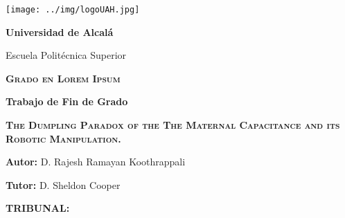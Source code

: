 
\enlargethispage{1cm}
\thispagestyle{empty}

\begin{center}
\texttt{[image: ../img/logoUAH.jpg]}
\par\end{center}

\begin{center}
\textbf{\huge Universidad de Alcalá}
\par\end{center}{\huge \par}

\begin{center}
{\Large Escuela Politécnica Superior}
\par\end{center}{\Large \par}

\medskip{}


\begin{center}
\textbf{\textsc{\huge Grado en Lorem Ipsum }}
\par\end{center}{\huge \par}

\medskip{}


\begin{center}
\textbf{\Large Trabajo de Fin de Grado}
\par\end{center}{\Large \par}

\begin{center}
\textbf{\textsc{\LARGE 
The Dumpling Paradox of the The Maternal Capacitance and its Robotic Manipulation.
}}
\par\end{center}{\LARGE \par}

\medskip{}


\begin{center}
\textbf{\large Autor:}{\large{} D. Rajesh Ramayan Koothrappali}
\par\end{center}{\large \par}
\begin{center}
\textbf{\large Tutor:}{\large{} D. Sheldon Cooper}
\par\end{center}{\large \par}

\vspace{1.0cm}
\textbf{\Large TRIBUNAL:}{\Large \par}

